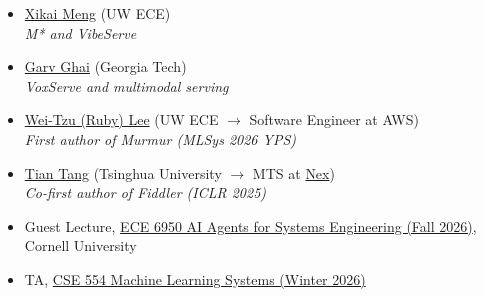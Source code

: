 \documentclass[10pt]{extarticle}
\begin{document}

\begin{itemize}
    \item \href{https://zhudiangg.github.io/}{Xikai Meng} (UW ECE) \\
    {\it M* and VibeServe}
    \item \href{https://www.linkedin.com/in/garv-ghai/}{Garv Ghai} (Georgia Tech) \\
    {\it VoxServe and multimodal serving}
    \item \href{https://rubywtl.github.io/}{Wei-Tzu (Ruby) Lee} (UW ECE $\rightarrow$ Software Engineer at AWS) \\
    {\it First author of Murmur (MLSys 2026 YPS)}
    \item \href{https://tang-t21.github.io/}{Tian Tang} (Tsinghua University $\rightarrow$ MTS at \href{https://nex-agi.com/}{Nex}) \\
    {\it Co-first author of Fiddler (ICLR 2025)}
\end{itemize}


\begin{itemize}
    \item Guest Lecture, \href{https://abdelfattah-class.github.io/ece6950_adrs/}{ECE 6950 AI Agents for Systems Engineering (Fall 2026)}, Cornell University
    \item TA, \href{https://courses.cs.washington.edu/courses/cse554/26wi/}{CSE 554 Machine Learning Systems (Winter 2026)}
\end{itemize}

\end{document}
